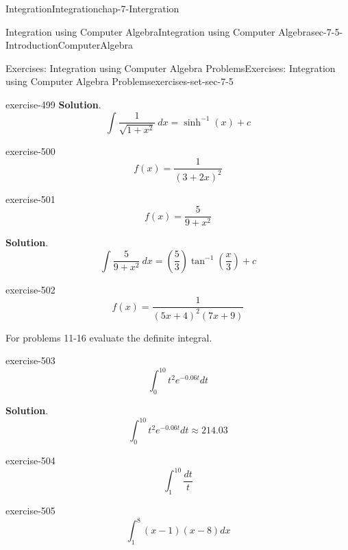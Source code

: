 \documentclass[oneside,10pt,]{book}
\numberwithin{equation}{section}
\begin{document}
\begin{chapterptx}{Integration}{}{Integration}{}{}{chap-7-Intergration}
\begin{sectionptx}{Integration using Computer Algebra}{}{Integration using Computer Algebra}{}{}{sec-7-5-IntroductionComputerAlgebra}
\begin{exercises-subsection-numberless}{Exercises: Integration using Computer Algebra Problems}{}{Exercises: Integration using Computer Algebra Problems}{}{}{exercises-set-sec-7-5}
\begin{divisionexercise}{7}{}{}{exercise-499}
\noindent\textbf{Solution}.\hypertarget{solution-253}{}\quad%
%
\begin{equation*}
\int \frac{1}{\sqrt{1+x^2}}\ dx= \sinh^{-1}(x)+c
\end{equation*}
\end{divisionexercise}%
\begin{divisionexercise}{8}{}{}{exercise-500}%
%
\begin{equation*}
f(x)=\frac{1}{(3+2x)^2} 
\end{equation*}
\end{divisionexercise}%
\begin{divisionexercise}{9}{}{}{exercise-501}%
%
\begin{equation*}
f(x)=\frac{5}{9+x^2 }
\end{equation*}
\par\smallskip%
\noindent\textbf{Solution}.\hypertarget{solution-254}{}\quad%
%
\begin{equation*}
\int \frac{5}{9+x^2 }\ dx = \left(\frac{5}{3}\right)\tan^{-1}\left(\frac{x}{3}\right)+c
\end{equation*}
\end{divisionexercise}%
\begin{divisionexercise}{10}{}{}{exercise-502}%
%
\begin{equation*}
f(x)=\frac{1}{(5x+4)^2 (7x+9)}
\end{equation*}
\end{divisionexercise}%
\hypertarget{p-2918}{}%
For problems 11-16 evaluate the definite integral.%
\begin{divisionexercise}{11}{}{}{exercise-503}%
%
\begin{equation*}
\int_0^{10} t^2 e^{-0.06t}  dt 
\end{equation*}
\par\smallskip%
\noindent\textbf{Solution}.\hypertarget{solution-255}{}\quad%
%
\begin{equation*}
\int_0^{10} t^2 e^{-0.06t}  dt \approx 214.03
\end{equation*}
\end{divisionexercise}%
\begin{divisionexercise}{12}{}{}{exercise-504}%
%
\begin{equation*}
\int_1^{10}\frac{dt}{t} 
\end{equation*}
\end{divisionexercise}%
\begin{divisionexercise}{13}{}{}{exercise-505}%
%
\begin{equation*}
\int_1^8(x-1)(x-8)  dx

\end{equation*}
\end{divisionexercise}
\end{exercises-subsection-numberless}
\end{sectionptx}
\end{chapterptx}
\end{document}
